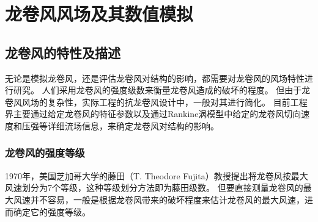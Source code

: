 \graphicspath{{figures/tornado/}}
\chapter{龙卷风风场及其数值模拟}\label{chapter:tornado}

\section{龙卷风的特性及描述}
无论是模拟龙卷风，还是评估龙卷风对结构的影响，都需要对龙卷风的风场特性进行研究。
人们采用龙卷风的强度级数来衡量龙卷风造成的破坏的程度。
但由于龙卷风风场的复杂性，实际工程的抗龙卷风设计中，一般对其进行简化。
目前工程界主要通过给定龙卷风的特征参数以及通过Rankine涡模型中给定的龙卷风切向速度和压强等详细流场信息，来确定龙卷风对结构的影响。

\subsection{龙卷风的强度等级}
1970年，美国芝加哥大学的藤田（T. Theodore Fujita）教授提出将龙卷风按最大风速划分为7个等级，这种等级划分方法即为藤田级数。
但要直接测量龙卷风的最大风速并不容易，一般是根据龙卷风带来的破坏程度来估计龙卷风的最大风速，进而确定它的强度等级。


